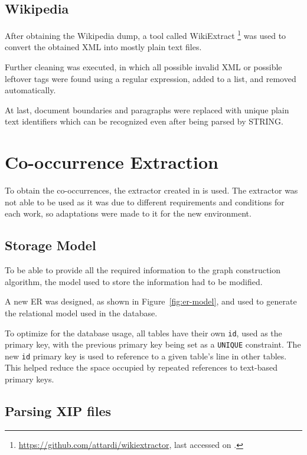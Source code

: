 \subsection{Wikipedia}

After obtaining the Wikipedia dump, a tool called WikiExtract
\footnote{\url{https://github.com/attardi/wikiextractor}, last accessed on
.} was used to convert the obtained \ac{XML} into mostly
plain text files.

Further cleaning was executed, in which all possible invalid \ac{XML} or
possible leftover tags were found using a regular expression, added to a list,
and removed automatically.

At last, document boundaries and paragraphs were replaced with unique
plain text identifiers which can be recognized even after being parsed by
\ac{STRING}.

\section{Co-occurrence Extraction}

To obtain the co-occurrences, the extractor created in \citep{correia2015syntax}
is used. The extractor was not able to be used as it was due to different
requirements and conditions for each work, so adaptations were made to it for
the new environment.

\subsection{Storage Model}

To be able to provide all the required information to the graph construction
algorithm, the model used to store the information had to be modified.

A new \ac{ER} was designed, as shown in Figure~\ref{fig:er-model}, and used to
generate the relational model used in the database.

To optimize for the database usage, all tables have their own \texttt{id},
used as the primary key, with the previous primary key being set as a
\texttt{UNIQUE} constraint. The new \texttt{id} primary key is used to reference
to a given table's line in other tables. This helped reduce the space occupied
by repeated references to text-based primary keys.

\subsection{Parsing \ac{XIP} files}

